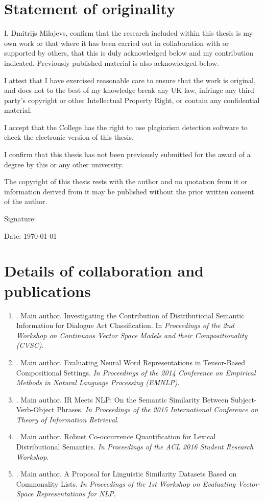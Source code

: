 \chapter*{Statement of originality}

I, Dmitrijs Milajevs, confirm that the research included within this thesis is my own work or that where it has been carried out in collaboration with or supported by others, that this is duly acknowledged below and my contribution indicated. Previously published material is also acknowledged below.

I attest that I have exercised reasonable care to ensure that the work is original, and does not to the best of my knowledge break any UK law, infringe any third party’s copyright or other Intellectual Property Right, or contain any confidential material.

I accept that the College has the right to use plagiarism detection software to check the electronic version of this thesis.

I confirm that this thesis has not been previously submitted for the award of a degree by this or any other university.

The copyright of this thesis rests with the author and no quotation from it or information derived from it may be published without the prior written consent of the author.

Signature:

Date: \today

\chapter*{Details of collaboration and publications}

\begin{enumerate}
\item \citet*{milajevs-purver:2014:CVSC}. Main author. Investigating the
  Contribution of Distributional Semantic Information for Dialogue Act
  Classification. In \textit{Proceedings of the 2nd Workshop on Continuous Vector Space Models and their Compositionality (CVSC)}.
\item \citet*{milajevs-EtAl:2014:EMNLP2014}. Main author. Evaluating Neural Word
  Representations in Tensor-Based Compositional Settings. \textit{In Proceedings of the 2014 Conference on Empirical Methods in Natural Language Processing (EMNLP)}.
\item \citet*{Milajevs:2015:IMN:2808194.2809448}. Main author. IR Meets NLP: On
  the Semantic Similarity Between Subject-Verb-Object Phrases. \textit{In Proceedings of the 2015 International Conference on Theory of Information Retrieval}.
\item \citet*{milajevs-sadrzadeh-purver:2016:ACL-SRW}. Main author. Robust Co-occurrence Quantification for Lexical Distributional Semantics. \textit{In Proceedings of the ACL 2016 Student Research Workshop}.
\item \citet*{milajevs-griffiths:2016:repeval}. Main author. A Proposal for Linguistic Similarity Datasets Based on Commonality Lists. \textit{In Proceedings of the 1st Workshop on Evaluating Vector-Space Representations for NLP}.
\end{enumerate}

